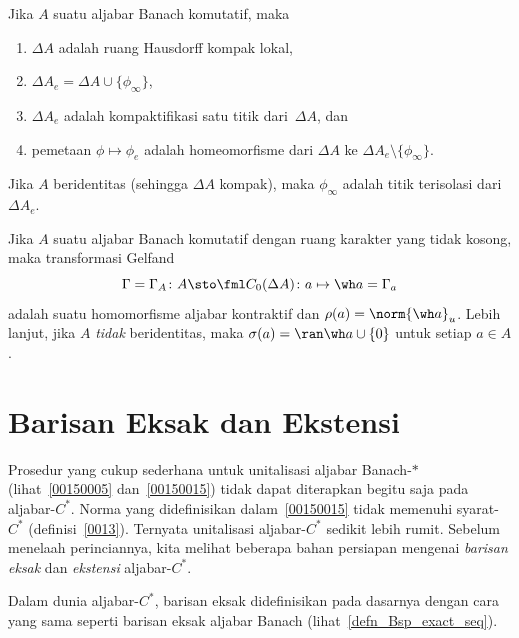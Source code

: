 \begin{prop} Jika $A$ suatu aljabar Banach komutatif, maka
 \begin{enumerate}
    \item[(a)] $\Delta A$ adalah ruang Hausdorff kompak lokal,
    \item[(b)] $\Delta A_e = \Delta A \cup \{\phi_\infty\}$,
    \item[(c)] $\Delta A_e$ adalah kompaktifikasi satu titik dari~$\Delta A$, dan
    \item[(d)] pemetaan $\phi \mapsto \phi_e$ adalah homeomorfisme dari $\Delta A$ ke
$\Delta A_e \setminus \{\phi_\infty\}$.
 \end{enumerate}
Jika $A$ beridentitas (sehingga $\Delta A$ kompak), maka $\phi_\infty$ adalah titik
terisolasi dari~$\Delta A_e$.
\end{prop}

\begin{thm} Jika $A$ suatu aljabar Banach komutatif dengan ruang karakter yang tidak kosong,
maka transformasi Gelfand
  \[ \Gamma = \Gamma_A\colon A \sto \fml C_0(\Delta A)\colon a \mapsto \wh a = \Gamma_a \]
adalah suatu homomorfisme aljabar kontraktif dan $\rho(a) = \norm{\wh a}_u$. Lebih lanjut,
jika $A$ \emph{tidak} beridentitas, maka $\sigma(a) = \ran \wh a \cup \{0\}$ untuk setiap
$a \in A$.
\end{thm}

















\section{Barisan Eksak dan Ekstensi}
Prosedur yang cukup sederhana untuk unitalisasi aljabar Banach-$*\,$
(lihat~\ref{00150005} dan~\ref{00150015}) tidak dapat diterapkan begitu saja pada
aljabar-$C^*$. Norma yang didefinisikan dalam~\ref{00150015} tidak memenuhi syarat-$C^*$
(definisi~\ref{0013}). Ternyata unitalisasi aljabar-$C^*$ sedikit lebih rumit. Sebelum
menelaah perinciannya, kita melihat beberapa bahan persiapan mengenai \emph{barisan eksak}
dan \emph{ekstensi} aljabar-$C^*$.

Dalam dunia aljabar-$C^*$, barisan eksak didefinisikan pada dasarnya dengan cara yang sama
seperti barisan eksak aljabar Banach (lihat~\ref{defn_Bsp_exact_seq}).

